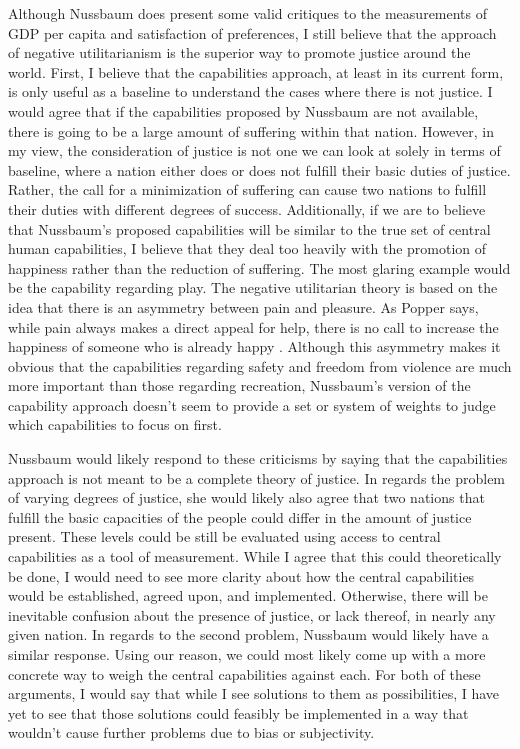 \documentclass[12pt]{article}
\begin{document}
Although Nussbaum does present some valid critiques to the measurements of GDP per capita and satisfaction of preferences, I still believe that the approach of negative utilitarianism is the superior way to promote justice around the world.
First, I believe that the capabilities approach, at least in its current form, is only useful as a baseline to understand the cases where there is not justice.
I would agree that if the capabilities proposed by Nussbaum are not available, there is going to be a large amount of suffering within that nation.
However, in my view, the consideration of justice is not one we can look at solely in terms of baseline, where a nation either does or does not fulfill their basic duties of justice.
Rather, the call for a minimization of suffering can cause two nations to fulfill their duties with different degrees of success.
Additionally, if we are to believe that Nussbaum's proposed capabilities will be similar to the true set of central human capabilities, I believe that they deal too heavily with the promotion of happiness rather than the reduction of suffering.
The most glaring example would be the capability regarding play.
The negative utilitarian theory is based on the idea that there is an asymmetry between pain and pleasure.
As Popper says, while pain always makes a direct appeal for help, there is no call to increase the happiness of someone who is already happy \autocite[284]{popper2002}.
Although this asymmetry makes it obvious that the capabilities regarding safety and freedom from violence are much more important than those regarding recreation, Nussbaum's version of the capability approach doesn't seem to provide a set or system of weights to judge which capabilities to focus on first.

Nussbaum would likely respond to these criticisms by saying that the capabilities approach is not meant to be a complete theory of justice.
In regards the problem of varying degrees of justice, she would likely also agree that two nations that fulfill the basic capacities of the people could differ in the amount of justice present.
These levels could be still be evaluated using access to central capabilities as a tool of measurement.
While I agree that this could theoretically be done, I would need to see more clarity about how the central capabilities would be established, agreed upon, and implemented.
Otherwise, there will be inevitable confusion about the presence of justice, or lack thereof, in nearly any given nation.
In regards to the second problem, Nussbaum would likely have a similar response.
Using our reason, we could most likely come up with a more concrete way to weigh the central capabilities against each.
For both of these arguments, I would say that while I see solutions to them as possibilities, I have yet to see that those solutions could feasibly be implemented in a way that wouldn't cause further problems due to bias or subjectivity.
\end{document}
